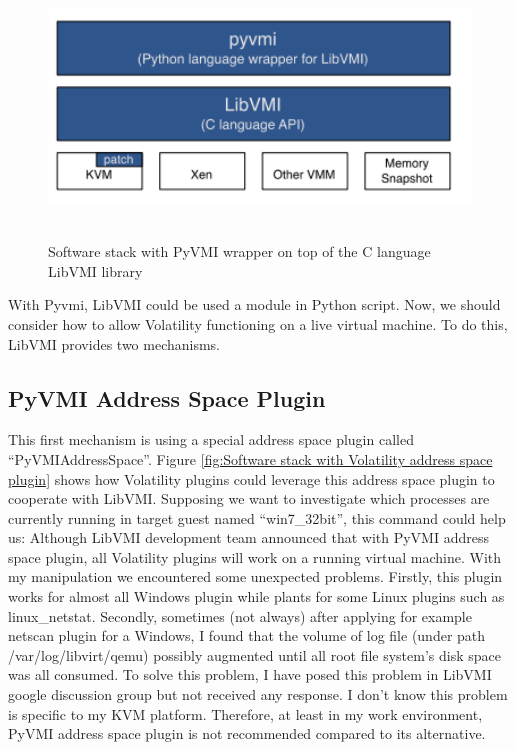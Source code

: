 \begin{figure}[htbp]
	\centering
		\includegraphics[width=14cm, height= 7cm ]{Figures/Figure29.png}
	\caption[Software stack with PyVMI wrapper on top of the C language LibVMI library]
	{Software stack with PyVMI wrapper on top of the C language LibVMI library \cite{Reference6}}
	\label{fig:Software stack with PyVMI wrapper on top of the C language LibVMI library}
\end{figure}

With Pyvmi, LibVMI could be used a module in Python script. Now, we should consider how to allow Volatility functioning on a live virtual machine. 
To do this, LibVMI provides two mechanisms.

\subsection{PyVMI Address Space Plugin}
This first mechanism is using a special address space plugin called “PyVMIAddressSpace”. Figure \ref{fig:Software stack with Volatility address space plugin}
shows how Volatility plugins could leverage this address space plugin to cooperate with LibVMI. Supposing we want to investigate which 
processes are currently running in target guest named “win7\_32bit”, this command could help us:
Although LibVMI development team announced that with PyVMI address space plugin, all Volatility plugins will work on a running virtual 
machine. With my manipulation we encountered some unexpected problems. Firstly, this plugin works for almost all Windows plugin while 
plants for some Linux plugins such as linux\_netstat. Secondly, sometimes (not always) after applying for example netscan plugin for a 
Windows, I found that the volume of log file (under path /var/log/libvirt/qemu) possibly augmented until all root file system’s disk 
space was all consumed. To solve this problem, I have posed this problem in LibVMI google discussion group but not received any response. 
I don’t know this problem is specific to my KVM platform. Therefore, at least in my work environment, PyVMI address space plugin is not 
recommended compared to its alternative.

